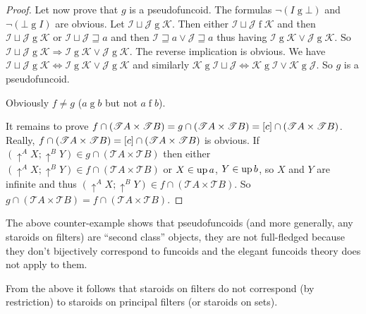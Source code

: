 \begin{proof}
Let now prove that $g$ is a pseudofuncoid. The formulas $\neg\left(I\mathrel{g}\bot\right)$
and $\neg\left(\bot\mathrel{g}I\right)$ are obvious. Let $\mathcal{I}\sqcup\mathcal{J}\mathrel{g}\mathcal{K}$.
Then either $\mathcal{I}\sqcup\mathcal{J}\mathrel{f}\mathcal{K}$
and then $\mathcal{I}\sqcup\mathcal{J}\mathrel{g}\mathcal{K}$ or
$\mathcal{I}\sqcup\mathcal{J}\sqsupseteq a$ and then $\mathcal{I}\sqsupseteq a\vee\mathcal{J}\sqsupseteq a$
thus having $\mathcal{I}\mathrel{g}\mathcal{K}\vee\mathcal{J}\mathrel{g}\mathcal{K}$.
So $\mathcal{I}\sqcup\mathcal{J}\mathrel{g}\mathcal{K}\Rightarrow\mathcal{I}\mathrel{g}\mathcal{K}\vee\mathcal{J}\mathrel{g}\mathcal{K}$.
The reverse implication is obvious. We have $\mathcal{I}\sqcup\mathcal{J}\mathrel{g}\mathcal{K}\Leftrightarrow\mathcal{I}\mathrel{g}\mathcal{K}\vee\mathcal{J}\mathrel{g}\mathcal{K}$
and similarly $\mathcal{K}\mathrel{g}\mathcal{I}\sqcup\mathcal{J}\Leftrightarrow\mathcal{K}\mathrel{g}\mathcal{I}\vee\mathcal{K}\mathrel{g}\mathcal{J}$.
So $g$ is a pseudofuncoid.

Obviously $f\neq g$ ($a\mathrel{g}b$ but not $a\mathrel{f}b$).

It remains to prove $f\cap(\mathscr{T}A\times\mathscr{T}B)=g\cap(\mathscr{T}A\times\mathscr{T}B)=\mathord{\mathrel{\left[c\right]}}\cap(\mathscr{T}A\times\mathscr{T}B)$.
Really, $f\cap(\mathscr{T}A\times\mathscr{T}B)=\mathord{\mathrel{\left[c\right]}}\cap(\mathscr{T}A\times\mathscr{T}B)$
is obvious. If $(\uparrow^{A}X;\uparrow^{B}Y)\in g\cap(\mathscr{T}A\times\mathscr{T}B)$
then either $(\uparrow^{A}X;\uparrow^{B}Y)\in f\cap(\mathscr{T}A\times\mathscr{T}B)$
or $X\in\operatorname{up} a$, $Y\in\operatorname{up} b$, so $X$ and $Y$ are infinite and thus
$(\uparrow^{A}X;\uparrow^{B}Y)\in f\cap(\mathscr{T}A\times\mathscr{T}B)$.
So $g\cap(\mathscr{T}A\times\mathscr{T}B)=f\cap(\mathscr{T}A\times\mathscr{T}B)$.\end{proof}
\begin{rem}
The above counter-example shows that pseudofuncoids (and more generally,
any staroids on filters) are ``second class'' objects, they are
not full-fledged because they don't bijectively correspond to funcoids
and the elegant funcoids theory does not apply to them.
\end{rem}
From the above it follows that staroids on filters do not correspond
(by restriction) to staroids on principal filters (or staroids on
sets).


